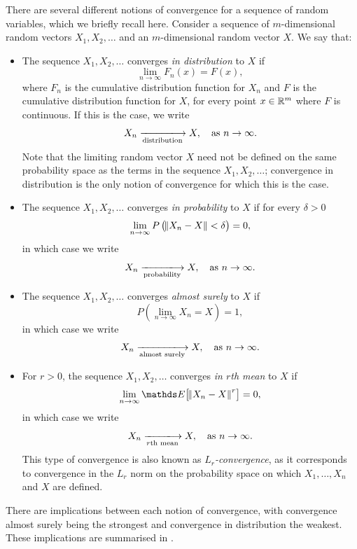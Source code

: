 There are several different notions of convergence for a sequence of random variables, which we briefly recall here.
Consider a sequence of \(m\)-dimensional random vectors \(X_1, X_2,\dotsc\) and an \(m\)-dimensional random vector \(X\).
We say that:
\begin{itemize}
	\item The sequence \(X_1, X_2, \dotsc\) converges \emph{in distribution} to \(X\) if
	      \[
		      \lim_{n\to\infty}F_n\left(x\right) = F(x),
	      \]
	      where \(F_n\) is the cumulative distribution function for \(X_n\) and \(F\) is the cumulative distribution function for \(X\), for every point \(x \in \mathbb{R}^m\) where \(F\) is continuous.
	      If this is the case, we write
	      \[
		      X_n \xlongrightarrow[\text{distribution}]{} X, \quad \text{as } n \to \infty.
	      \]
	      Note that the limiting random vector \(X\) need not be defined on the same probability space as the terms in the sequence \(X_1, X_2, \dotsc\); convergence in distribution is the only notion of convergence for which this is the case.


	\item The sequence \(X_1, X_2, \dotsc\) converges \emph{in probability} to \(X\) if for every \(\delta > 0\)
	      \[
		      \lim_{n\to\infty}P\left(\norm{X_n - X} < \delta\right) = 0,
	      \]
	      in which case we write
	      \[
		      X_n \xlongrightarrow[\text{probability}]{} X, \quad \text{as } n \to \infty.
	      \]

	\item The sequence \(X_1, X_2, \dotsc\) converges \emph{almost surely} to \(X\) if
	      \[
		      P\left(\lim_{n \to \infty}X_n = X\right) = 1,
	      \]
	      in which case we write
	      \[
		      X_n \xlongrightarrow[\text{almost surely}]{} X, \quad \text{as } n \to \infty.
	      \]

	\item For \(r > 0\), the sequence \(X_1, X_2, \dotsc\) converges \emph{in \(r\)th mean} to \(X\) if
	      \[
		      \lim_{n\to\infty}{\avg{\norm{X_n - X}^r}} = 0,
	      \]
	      in which case we write
	      \[
		      X_n \xlongrightarrow[r\text{th mean}]{} X, \quad \text{as } n \to \infty.
	      \]
	      This type of convergence is also known as \emph{\(L_r\)-convergence}, as it corresponds to convergence in the \(L_r\) norm on the probability space on which \(X_1,\dotsc, X_n\) and \(X\) are defined.

\end{itemize}
There are implications between each notion of convergence, with convergence almost surely being the strongest and convergence in distribution the weakest.
These implications are summarised in .


